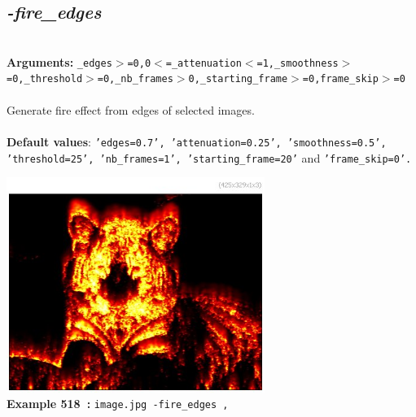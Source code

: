 \documentclass[a4paper,11pt,twoside]{book}
\begin{document}
\subsection{\emph{-fire\_edges} }\vspace*{-0.5em}
~\\\textbf{Arguments: } 
{\small \texttt{\_edges$>$=0,0$<$=\_attenuation$<$=1,\_smoothness$>$=0,\_threshold$>$=0,\_nb\_frames$>$0,\_starting\_frame$>$=0,frame\_skip$>$=0}}\\~\\
Generate fire effect from edges of selected images.
~\\~\\\textbf{Default values}: {\small \texttt{'edges=0.7', 'attenuation=0.25', 'smoothness=0.5', 'threshold=25', 'nb\_frames=1', 'starting\_frame=20'} and \texttt{'frame\_skip=0'.}}
\begin{center}\includegraphics[keepaspectratio=true,height=7cm,width=\textwidth]{img/gmic_def518.jpg}\\
{\footnotesize \textbf{Example 518~:} \texttt{image.jpg -fire\_edges ,}}
\end{center}
\end{document}
